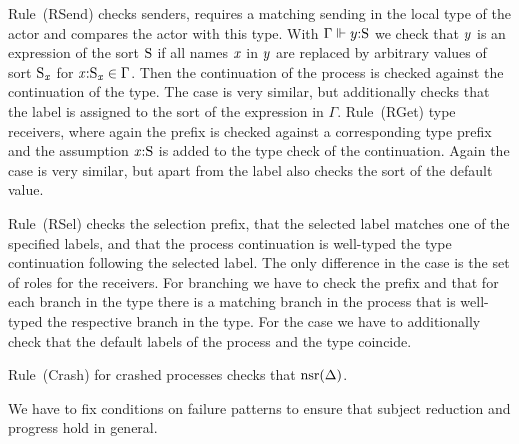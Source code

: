 Rule~(\textsf{RSend}) checks \strongR senders, \ie requires a matching \strongR sending in the local type of the actor and compares the actor with this type.
With $ \Gamma \Vdash \Typed{\Expr[y]}{\Sort} $ we check that $ \Expr[y] $ is an expression of the sort $ \Sort $ if all names $ \Args $ in $ \Expr[y] $ are replaced by arbitrary values of sort $ \Sort_{\Args} $ for $ \Typed{\Args}{\Sort_{\Args}} \in \Gamma $.
Then the continuation of the process is checked against the continuation of the type.
The \unrel case is very similar, but additionally checks that the label is assigned to the sort of the expression in $ \Gamma $.
Rule~(\textsf{RGet}) type \strongR receivers, where again the prefix is checked against a corresponding type prefix and the assumption $ \Typed{\Args}{\Sort} $ is added to the type check of the continuation.
Again the \unrel case is very similar, but apart from the label also checks the sort of the default value.

Rule~(\textsf{RSel}) checks the \strongR selection prefix, that the selected label matches one of the specified labels, and that the process continuation is well-typed \wrt the type continuation following the selected label.
The only difference in the \weakR case is the set of roles for the receivers.
For \strongR branching we have to check the prefix and that for each branch in the type there is a matching branch in the process that is well-typed \wrt the respective branch in the type.
For the \weakR case we have to additionally check that the default labels of the process and the type coincide.

Rule~(\textsf{Crash}) for crashed processes checks that $ \Unreliable{\Delta} $.


We have to fix conditions on failure patterns to ensure that subject reduction and progress hold in general.

